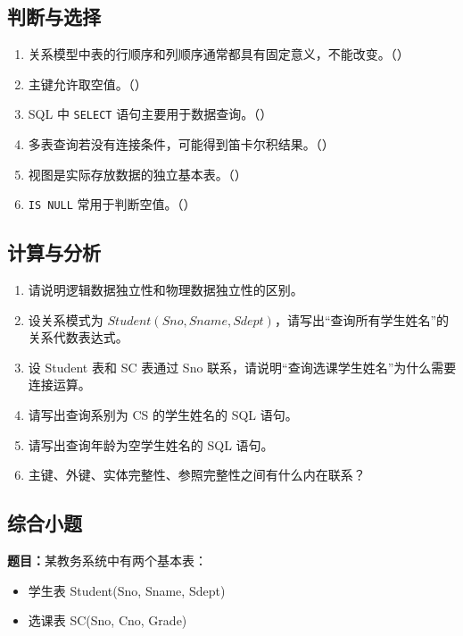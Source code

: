 \documentclass{../../note}
\begin{document}
\subsection{判断与选择}

\begin{enumerate}
  \item 关系模型中表的行顺序和列顺序通常都具有固定意义，不能改变。（\hspace{1cm}）
  \item 主键允许取空值。（\hspace{1cm}）
  \item SQL 中 \texttt{SELECT} 语句主要用于数据查询。（\hspace{1cm}）
  \item 多表查询若没有连接条件，可能得到笛卡尔积结果。（\hspace{1cm}）
  \item 视图是实际存放数据的独立基本表。（\hspace{1cm}）
  \item \texttt{IS NULL} 常用于判断空值。（\hspace{1cm}）
\end{enumerate}

\subsection{计算与分析}

\begin{enumerate}
  \item 请说明逻辑数据独立性和物理数据独立性的区别。
  \item 设关系模式为 $Student(Sno, Sname, Sdept)$，请写出“查询所有学生姓名”的关系代数表达式。
  \item 设 Student 表和 SC 表通过 Sno 联系，请说明“查询选课学生姓名”为什么需要连接运算。
  \item 请写出查询系别为 CS 的学生姓名的 SQL 语句。
  \item 请写出查询年龄为空学生姓名的 SQL 语句。
  \item 主键、外键、实体完整性、参照完整性之间有什么内在联系？
\end{enumerate}

\subsection{综合小题}

\textbf{题目：}某教务系统中有两个基本表：

\begin{itemize}
  \item 学生表 Student(Sno, Sname, Sdept)
  \item 选课表 SC(Sno, Cno, Grade)
\end{itemize}
\end{document}
